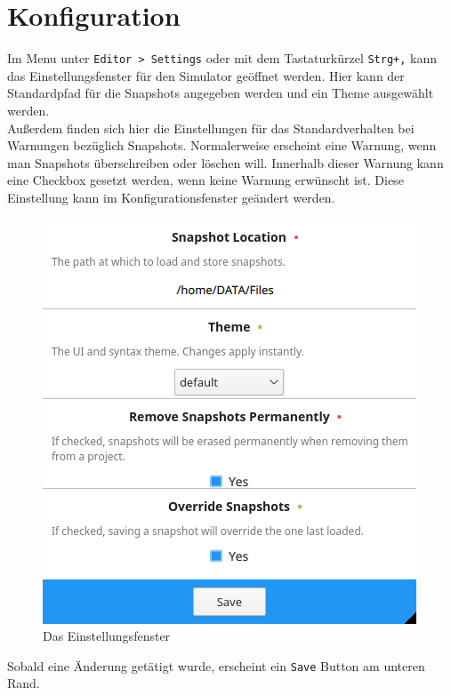 
\section{Konfiguration}

Im Menu unter \texttt{Editor > Settings} oder mit dem Tastaturkürzel \texttt{Strg+,} kann das Einstellungsfenster für den Simulator geöffnet werden.
Hier kann der Standardpfad für die Snapshots angegeben werden und ein Theme ausgewählt werden.\\
Außerdem finden sich hier die Einstellungen für das Standardverhalten bei Warnungen bezüglich Snapshots. Normalerweise erscheint eine Warnung, wenn man Snapshots überschreiben oder löschen will. 
Innerhalb dieser Warnung kann eine Checkbox gesetzt werden, wenn keine Warnung erwünscht ist. Diese Einstellung kann im Konfigurationsfenster geändert werden.


\begin{figure}[ht]
	\centering
  \includegraphics[scale=0.9]{Images/Settings}
	\caption{Das Einstellungsfenster}
	\label{Settings}
\end{figure}


Sobald eine Änderung getätigt wurde, erscheint ein \texttt{Save} Button am unteren Rand.